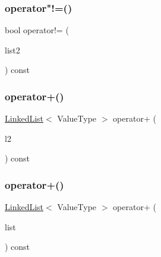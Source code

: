 \subsubsection{\texorpdfstring{operator"!=()}{operator!=()}}
{\footnotesize\ttfamily bool operator!= (\begin{DoxyParamCaption}\item[{const \mbox{\hyperlink{classLinkedList}{Linked\+List}}$<$ Value\+Type $>$ \&}]{list2 }\end{DoxyParamCaption}) const}

\mbox{\label{classLinkedList_a481f0eabff2912b261b522aaf561b067}} 
\subsubsection{\texorpdfstring{operator+()}{operator+()}\hspace{0.1cm}{\footnotesize\ttfamily [1/2]}}
{\footnotesize\ttfamily \mbox{\hyperlink{classLinkedList}{Linked\+List}}$<$ Value\+Type $>$ operator+ (\begin{DoxyParamCaption}\item[{const \mbox{\hyperlink{classLinkedList}{Linked\+List}}$<$ Value\+Type $>$ \&}]{l2 }\end{DoxyParamCaption}) const}

\mbox{\label{classLinkedList_a722fa9320d5ad78caeda370f755ddc7d}} 
\subsubsection{\texorpdfstring{operator+()}{operator+()}\hspace{0.1cm}{\footnotesize\ttfamily [2/2]}}
{\footnotesize\ttfamily \mbox{\hyperlink{classLinkedList}{Linked\+List}}$<$ Value\+Type $>$ operator+ (\begin{DoxyParamCaption}\item[{std\+::initializer\+\_\+list$<$ Value\+Type $>$}]{list }\end{DoxyParamCaption}) const}

\mbox{\label{classLinkedList_ae07506d03c2a077c0ade134416371c78}} 
